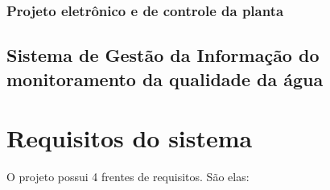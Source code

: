       \subsubsection{Projeto eletrônico e de controle da planta}
        
        
        
    \subsection{Sistema de Gestão da Informação do monitoramento da qualidade da água}
	
	
      
  \section{Requisitos do sistema}
  
      O projeto possui 4 frentes de requisitos. São elas:
      
